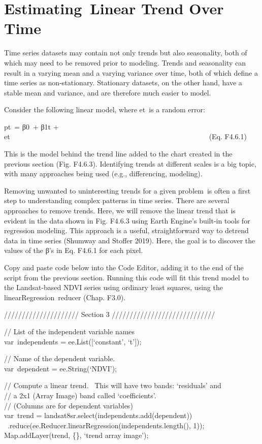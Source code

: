 \documentclass[
  letterpaper,
  DIV=11,
  numbers=noendperiod]{scrreprt}
\begin{document}
\hypertarget{estimating-linear-trend-over-time}{%
\section{Estimating~Linear Trend Over
Time}\label{estimating-linear-trend-over-time}}

Time series datasets may contain not only trends but also seasonality,
both of which may need to be removed prior to modeling. Trends and
seasonality can result in a varying mean and a varying variance over
time, both of which define a time series as non-stationary. Stationary
datasets, on the other hand, have a stable mean and variance, and are
therefore much easier to model.

Consider the following linear model, where et~is a random error:

pt~= β0~+ β1t +
et~~~~~~~~~~~~~~~~~~~~~~~~~~~~~~~~~~~~~~~~~~~~~~~~~~~~~~~~(Eq. F4.6.1)

This is the model behind the trend line added to the chart created in
the previous section (Fig. F4.6.3). Identifying trends at different
scales is a big topic, with many approaches being used (e.g.,
differencing, modeling).

Removing unwanted to uninteresting trends for a given problem~is often a
first step to understanding complex patterns in time series. There are
several approaches to remove trends. Here, we will remove the linear
trend that is evident in the data shown in Fig. F4.6.3 using Earth
Engine's built-in tools for regression modeling. This approach is a
useful, straightforward way to detrend data in time series (Shumway and
Stoffer 2019). Here, the goal is to discover the values of the β's in
Eq. F4.6.1 for each pixel.

Copy and paste code below into the Code Editor, adding it to the end of
the script from the previous section. Running this code will fit this
trend model to the Landsat-based NDVI series using ordinary least
squares, using the linearRegression~reducer (Chap. F3.0).

///////////////////// Section 3 /////////////////////////////

// List of the independent variable names\\
var~independents = ee.List({[}`constant', `t'{]});

// Name of the dependent variable.\\
var~dependent = ee.String(`NDVI');

// Compute a linear trend. ~This will have two bands: `residuals' and\\
// a 2x1 (Array Image) band called `coefficients'.\\
// (Columns are for dependent variables)\\
var~trend = landsat8sr.select(independents.add(dependent))\\
\hspace*{0.333em}
~.reduce(ee.Reducer.linearRegression(independents.length(), 1));\\
Map.addLayer(trend, \{\}, `trend array image');
\end{document}
